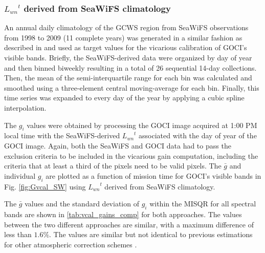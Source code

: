 \documentclass[10pt]{article}
\begin{document}
\subsubsection{${L_{wn}}^t$ derived from SeaWiFS climatology}
An annual daily climatology of the GCWS region from SeaWiFS observations from 1998 to 2009 (11 complete years) was generated in a similar fashion as described in \cite{Werdell:07} and used as target values for the vicarious calibration of GOCI's visible bands. Briefly, the SeaWiFS-derived data were organized by day of year and then binned biweekly resulting in a total of 26 sequential 14-day collections. Then, the mean of the semi-interquartile range for each bin was calculated and smoothed using a three-element central moving-average for each bin. Finally, this time series was expanded to every day of the year by applying a cubic spline interpolation. 

The $g_i$ values were obtained by processing the GOCI image acquired at 1:00 PM local time with the SeaWiFS-derived ${L_{wn}}^t$ associated with the day of year of the GOCI image. Again, both the SeaWiFS and GOCI data had to pass the exclusion criteria to be included in the vicarious gain computation, including the criteria that at least a third of the pixels need to be valid pixels. The $\bar{g}$ and individual $g_i$ are plotted as a function of mission time for GOCI's visible bands in Fig. \ref{fig:Gvcal_SW} using ${L_{wn}}^t$ derived from SeaWiFS climatology.

The $\bar{g}$ values and the standard deviation of $g_i$ within the MISQR for all spectral bands are shown in \autoref{tab:vcal_gains_comp} for both approaches. The values between the two different approaches are similar, with a maximum difference of less than $1.6\%$. The values are similar but not identical to previous estimations for other atmospheric correction schemes \cite{Wang:13,Ahn2015}. 
\end{document}
